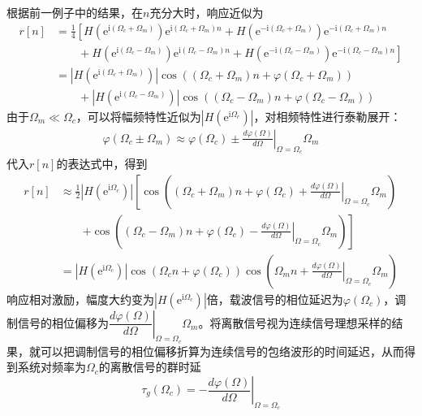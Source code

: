 \documentclass{ctexbook}
\begin{document}
\begin{example}
    根据前一例子中的结果，在$n$充分大时，响应近似为
    \begin{align*}
        r[n]&=\frac{1}{4}\left[H(\mathrm{e}^{\mathrm{i}(\Omega_c+\Omega_m)})\mathrm{e}^{\mathrm{i}(\Omega_c+\Omega_m)n}+H(\mathrm{e}^{-\mathrm{i}(\Omega_c+\Omega_m)})\mathrm{e}^{-\mathrm{i}(\Omega_c+\Omega_m)n}\right.\\
        &\qquad +\left.H(\mathrm{e}^{\mathrm{i}(\Omega_c-\Omega_m)})\mathrm{e}^{\mathrm{i}(\Omega_c-\Omega_m)n}+H(\mathrm{e}^{-\mathrm{i}(\Omega_c-\Omega_m)})\mathrm{e}^{-\mathrm{i}(\Omega_c-\Omega_m)n}\right]\\
        &=|H(\mathrm{e}^{\mathrm{i}(\Omega_c+\Omega_m)})|\cos((\Omega_c+\Omega_m)n+\varphi(\Omega_c+\Omega_m))\\
        &\qquad +|H(\mathrm{e}^{\mathrm{i}(\Omega_c-\Omega_m)})|\cos((\Omega_c-\Omega_m)n+\varphi(\Omega_c-\Omega_m))
    \end{align*}
    由于$\Omega_m\ll\Omega_c$，可以将幅频特性近似为$|H(\mathrm{e}^{\mathrm{i}\Omega_c})|$，对相频特性进行泰勒展开：
    \begin{align*}
        \varphi(\Omega_c\pm\Omega_m)\approx \varphi(\Omega_c)\pm \left.\frac{d\varphi(\Omega)}{d\Omega}\right|_{\Omega=\Omega_c}\Omega_m
    \end{align*}
    代入$r[n]$的表达式中，得到
    \begin{align*}
        r[n]&\approx \frac{1}{2}|H(\mathrm{e}^{\mathrm{i}\Omega_c})|\left[\cos\left((\Omega_c+\Omega_m)n+\varphi(\Omega_c)+\left.\frac{d\varphi(\Omega)}{d\Omega}\right|_{\Omega=\Omega_c}\Omega_m\right)\right.\\
        &\qquad\left.+\cos\left((\Omega_c-\Omega_m)n+\varphi(\Omega_c)-\left.\frac{d\varphi(\Omega)}{d\Omega}\right|_{\Omega=\Omega_c}\Omega_m\right)\right]\\
        &=|H(\mathrm{e}^{\mathrm{i}\Omega_c})|\cos\left(\Omega_c n+\varphi(\Omega_c)\right)\cos\left(\Omega_m n+\left.\frac{d\varphi(\Omega)}{d\Omega}\right|_{\Omega=\Omega_c}\Omega_m\right)
    \end{align*}
    响应相对激励，幅度大约变为$|H(\mathrm{e}^{\mathrm{i}\Omega_c})|$倍，载波信号的相位延迟为$\varphi(\Omega_c)$，调制信号的相位偏移为$\left.\dfrac{d\varphi(\Omega)}{d\Omega}\right|_{\Omega=\Omega_c}\Omega_m$。将离散信号视为连续信号理想采样的结果，就可以把调制信号的相位偏移折算为连续信号的包络波形的时间延迟，从而得到系统对频率为$\Omega_c$的离散信号的群时延
    $$\tau_g(\Omega_c)=-\left.\frac{d\varphi(\Omega)}{d\Omega}\right|_{\Omega=\Omega_c}$$
\end{example}
\end{document}
